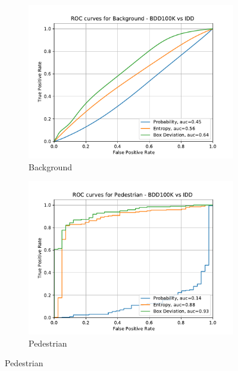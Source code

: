     \begin{figure}[H]
    	\centering
    	\begin{subfigure}[t]{0.495\textwidth}
    		\centering
    		\includegraphics[width=\textwidth]{images/ROC/background_ROC_bdd_vs_idd_Score_using_bnn.pdf}
    		\caption{Background}
    	\end{subfigure}
    	\begin{subfigure}[t]{0.495\textwidth}
    		\centering
    		\includegraphics[width=\textwidth]{images/ROC/pedestrian_ROC_bdd_vs_idd_Score_using_bnn.pdf}
    		\caption{Pedestrian}
    	\end{subfigure}
    	

\end{figure}
